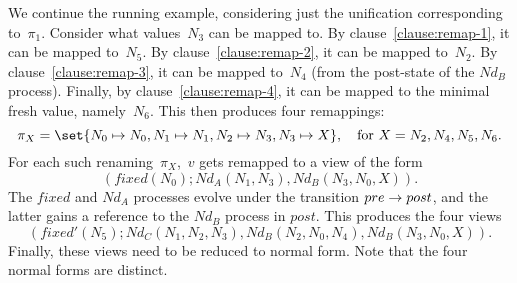 
\begin{example}
We continue the running example, considering just the unification
corresponding to~$\pi_1$.  Consider what values~$N_3$ can be mapped to.  By
clause~\ref{clause:remap-1}, it can be mapped to~$N_5$.  By
clause~\ref{clause:remap-2}, it can be mapped to~$N_2$.  By
clause~\ref{clause:remap-3}, it can be mapped to~$N_4$ (from the post-state of
the $Nd_B$ process).  Finally, by clause~\ref{clause:remap-4}, it can be
mapped to the minimal fresh value, namely~$N_6$.
%
This then produces four remappings:
\[
\pi_X = \set{N_0 \mapsto N_0, N_1 \mapsto N_1, N_2 \mapsto N_3, N_3 \mapsto X},
\quad \mbox{for $X = N_2, N_4, N_5, N_6$}.
\]
For each such renaming~$\pi_X$,\, $v$ gets remapped to a view of the form
\[
(fixed(N_0); Nd_A(N_1, N_3), Nd_B(N_3, N_0, X)).
\]
The $fixed$ and $Nd_A$ processes evolve under the transition \( pre
\stackrel{}\rightarrow post \), and the latter gains a reference to the $Nd_B$ process in
$post$.  This produces the four views
\[
(fixed'(N_5); Nd_C(N_1, N_2, N_3), Nd_B(N_2, N_0, N_4), Nd_B(N_3, N_0, X)).
\]
Finally, these views need to be reduced to normal form.  Note that the four
normal forms are distinct.
\end{example}


